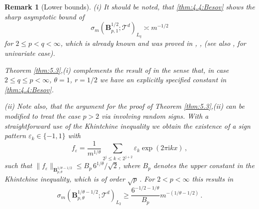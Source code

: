\documentclass[11pt,reqno]{article}
\numberwithin{equation}{section}
\theoremstyle{definition}
\theoremstyle{plain}
\newtheorem*{rem*}{Remark}
\begin{document}
\begin{rem*}[Lower bounds] {\em (i)} It should be noted, that \eqref{thm:4.4:Besov} shows the sharp asymptotic bound of $$\sigma_{m}(\mathbf{B}^{1/2}_{p,1};\mathcal{T}^d)_{L_q} \asymp m^{-1/2}$$ 
for $2\leq p<q<\infty$, which is already known and was proved in \cite[Thm.\ 1]{Rom_I_92}, \cite[Thm.\ 2.1]{Romanyuk_Izv_2003}, \cite[Thm.\ 2]{Stas_TrIMM_2017} (see also \cite[Thm.\ 3]{Belinsk_Msb_1987}, 
\cite[Thm.\ 2]{Stas_JAT_2014}
for univariate case).

Theorem \ref{thm:5.3},(i) complements the result of \cite[Thm.\ 3.2]{Romanyuk_Izv_2003} in the sense that, in case $2\leq q \leq p<\infty$, $\theta=1$, $r=1/2$ we have an explicitly specified constant in \eqref{thm:4.4:Besov}.





{\em (ii)} Note also, that the argument for the proof of Theorem \ref{thm:5.3},(ii) can be modified to treat the case $p>2$ via involving random signs. With a straightforward use of the Khintchine inequality we obtain the existence of a sign pattern $\varepsilon_k \in \{-1,1\}$ with 
$$
  f_{\varepsilon} = \frac{1}{m^{1/\theta}}\sum\limits_{2^j \leq k < 2^{j+2}} \varepsilon_k \exp(2\pi \mathrm{i} kx)\,,
$$
such that $\|f_\varepsilon\|_{\mathbf{B}^{1/\theta-1/2}_{p,\theta}} \leq B_p\,6^{1/\theta}/\sqrt{2}$, where $B_p$ denotes the upper constant in the Khintchine inequality, which is of order $\sqrt{p}$\,. For $2<p<\infty$ this results in 
$$
\sigma_{m}(\mathbf{B}^{1/\theta-1/2}_{p,\theta};\mathcal{T}^d)_{L_2}  \geq \frac{6^{-1/2-1/\theta}}{B_p} m^{-(1/\theta-1/2)}\,.
$$


\end{rem*} 
\end{document}
